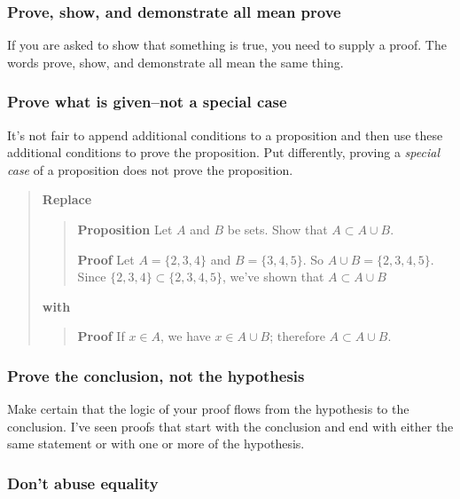\documentclass[12pt]{article}
\newcounter{ex}\setcounter{ex}{0}
\newcounter{se}\setcounter{se}{0}
\begin{document}
 \subsubsection{ Prove, show, and demonstrate all mean prove}

If you are asked to show that something is true, you need to
supply a proof.  The words prove, show, and demonstrate all mean the
same thing. 

 \subsubsection{ Prove what is given--not a special case}

It's not fair to append additional conditions to a proposition and 
then use these additional conditions to prove the proposition.  Put
differently, proving a {\em special case\/} of a proposition does not
prove the proposition. 

\begin{quote}
\textbf{Replace}
\begin{quote}
 \textbf {Proposition} Let \(A\) and \(B\) be sets.  Show that 
\(A \subset A \cup B\).

\vspace{0.1in}

\textbf{Proof} Let \(A = \{2,3,4\}\) and \(B = \{3,4,5\}\).  So
\mbox{\(A \cup B = \{2,3,4,5\}\)}.  Since \(\{2,3,4\} \subset \{2,3,4,5\}\),
we've shown that \(A \subset A \cup B\)
\end{quote}
\textbf{with}
\begin{quote}
 \textbf {Proof}  If \(x \in A\), we have \(x \in A \cup B\); therefore
\(A \subset A \cup B\).
\end{quote}
\end{quote}

 \subsubsection{ Prove the conclusion, not the hypothesis}

Make certain that the logic of your proof flows from the 
hypothesis to the conclusion. I've seen proofs that
start with the conclusion and end with either the same statement
or with one or more of the hypothesis.  



 \subsubsection{Don't abuse equality}
\end{document}
